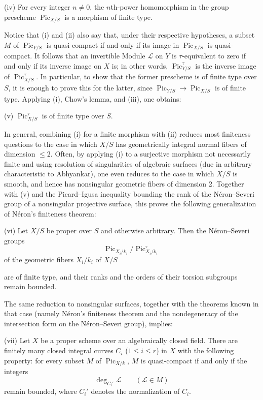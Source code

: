 \noindent(iv) For every integer $n\neq0$, the $n$th-power homomorphism in the
group prescheme $\operatorname{Pic}_{X/S}$ is a morphism of finite type.

Notice that (i) and (ii) also say that, under their respective hypotheses, a
subset $M$ of $\operatorname{Pic}_{Y/S}$ is quasi-compact if and only if its
image in $\operatorname{Pic}_{X/S}$ is quasi-compact. It follows that an
invertible Module $\mathcal L$ on $Y$ is $\tau$-equivalent to zero if and only
if its inverse image on $X$ is; in other words,
$\operatorname{Pic}_{Y/S}^\tau$ is the inverse image of
$\operatorname{Pic}_{X/S}^\tau$. In particular, to show that the former
prescheme is of finite type over $S$, it is enough to prove this for the latter,
since $\operatorname{Pic}_{Y/S}\longrightarrow
\operatorname{Pic}_{X/S}$ is of finite type. Applying (i), Chow's lemma, and
(iii), one obtains:

\medskip
\noindent(v) $\operatorname{Pic}_{X/S}^\tau$ is of finite type over $S$.

In general, combining (i) for a finite morphism with (ii) reduces most
finiteness questions to the case in which $X/S$ has geometrically integral
normal fibers of dimension $\leq2$. Often, by applying (i) to a surjective
morphism not necessarily finite and using resolution of singularities of
algebraic surfaces (due in arbitrary characteristic to Abhyankar), one even
reduces to the case in which $X/S$ is smooth, and hence has nonsingular
geometric fibers of dimension 2. Together with (v) and the Picard--Igusa
inequality bounding the rank of the Néron--Severi group of a nonsingular
projective surface, this proves the following generalization of Néron's
finiteness theorem:

\medskip
\noindent(vi) Let $X/S$ be proper over $S$ and otherwise arbitrary. Then the
Néron--Severi groups
\[
\operatorname{Pic}_{X_i/k_i}/\operatorname{Pic}_{X_i/k_i}^\circ
\]
of the geometric fibers $X_i/k_i$ of $X/S$

are of finite type, and their ranks and the orders of their torsion subgroups
remain bounded.

The same reduction to nonsingular surfaces, together with the theorems known
in that case (namely Néron's finiteness theorem and the nondegeneracy of the
intersection form on the Néron--Severi group), implies:

\medskip
\noindent(vii) Let $X$ be a proper scheme over an algebraically closed field.
There are finitely many closed integral curves $C_i$ ($1\leq i\leq r$) in
$X$ with the following property: for every subset $M$ of
$\operatorname{Pic}_{X/k}$, $M$ is quasi-compact if and only if the integers
\[
\deg_{C_i'}\mathcal L\qquad(\mathcal L\in M)
\]
remain bounded, where $C_i'$ denotes the normalization of $C_i$.

